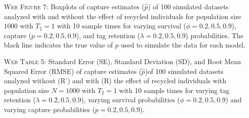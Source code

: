 \documentclass[]{article}
\begin{document}
\textsc{Web Figure 7:} Boxplots of capture estimates (\(\hat{p}\)) of
100 simulated datasets analyzed with and without the effect of recycled
individuals for population size \(1000\) with \(T_2=1\) with 10 sample times for varying survival (\(\phi=0.2,0.5,0.9\)), capture
(\(p=0.2,0.5,0.9\)), and tag retention (\(\lambda=0.2,0.5,0.9\))
probabilities. The black line indicates the true value of \(p\) used to
simulate the data for each model.

\textsc{Web Table 5:} Standard Error (SE), Standard Deviation (SD), and
Root Mean Squared Error (RMSE) of capture estimates (\(\hat{p}\))of 100
simulated datasets analyzed without (R') and with (R) the effect of
recycled individuals with population size \(N=1000\) with \(T_2=1\) with
10 sample times for varying tag retention (\(\lambda=0.2,0.5,0.9\)),
varying survival probabilities (\(\phi=0.2,0.5,0.9\)) and varying
capture probabilities (\(p=0.2,0.5,0.9\)).
\end{document}
